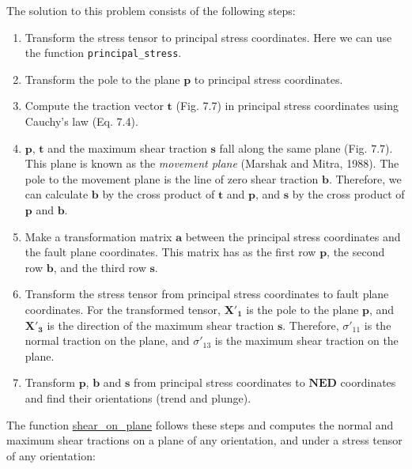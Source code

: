 \documentclass[a4paper , 12pt]{book}
\newcommand{\code}[1]{\colorbox{light-gray}{\texttt{#1}}}
\begin{document}
The solution to this problem consists of the following steps:

\begin{enumerate}
    \item Transform the stress tensor to principal stress coordinates. Here we can use the function \code{principal\_stress}.
    \item Transform the pole to the plane $\mathbf{p}$ to principal stress coordinates.
    \item Compute the traction vector $\mathbf{t}$ (Fig. 7.7) in principal stress coordinates using Cauchy's law (Eq. 7.4).
    \item $\mathbf{p}$, $\mathbf{t}$ and the maximum shear traction $\mathbf{s}$ fall along the same plane (Fig. 7.7). This plane is known as the \textit{movement plane} (Marshak and Mitra, 1988). The pole to the movement plane is the line of zero shear traction $\mathbf{b}$. Therefore, we can calculate $\mathbf{b}$ by the cross product of $\mathbf{t}$ and $\mathbf{p}$, and $\mathbf{s}$ by the cross product of $\mathbf{p}$ and $\mathbf{b}$. 
    \item Make a transformation matrix $\mathbf{a}$ between the principal stress coordinates and the fault plane coordinates. This matrix has as the first row $\mathbf{p}$, the second row $\mathbf{b}$, and the third row $\mathbf{s}$.
    \item Transform the stress tensor from principal stress coordinates to fault plane coordinates. For the transformed tensor, $\mathbf{X'_1}$ is the pole to the plane $\mathbf{p}$, and $\mathbf{X'_3}$ is the direction of the maximum shear traction $\mathbf{s}$. Therefore, $\sigma'_{11}$ is the normal traction on the plane, and $\sigma'_{13}$ is the maximum shear traction on the plane.
    \item Transform $\mathbf{p}$, $\mathbf{b}$ and $\mathbf{s}$ from principal stress coordinates to $\mathbf{NED}$ coordinates and find their orientations (trend and plunge).
\end{enumerate}

The function \href{https://github.com/nfcd/compGeo/blob/master/source/functions/shear_on_plane.py}{shear\_on\_plane} follows these steps and computes the normal and maximum shear tractions on a plane of any orientation, and under a stress tensor of any orientation:
\end{document}

